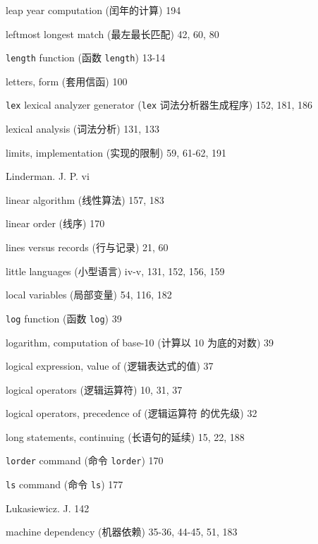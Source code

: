 \begin{multicols}{3}
\hangindent=3pc  leap year computation (闰年的计算) 194

\hangindent=3pc  leftmost longest match (最左最长匹配) 42, 60, 80

\hangindent=3pc  \verb'length' function (函数 \verb'length') 13-14

\hangindent=3pc  letters, form (套用信函) 100

\hangindent=3pc  \verb'lex' lexical analyzer generator
(\verb'lex' 词法分析器生成程序) 152, 181, 186

\hangindent=3pc  lexical analysis (词法分析) 131, 133

\hangindent=3pc  limits, implementation (实现的限制) 59, 61-62, 191

\hangindent=3pc  Linderman. J. P. vi

\hangindent=3pc  linear algorithm (线性算法) 157, 183

\hangindent=3pc  linear order (线序) 170

\hangindent=3pc  lines versus records (行与记录) 21, 60

\hangindent=3pc  little languages (小型语言) iv-v, 131, 152, 156, 159

\hangindent=3pc  local variables (局部变量) 54, 116, 182

\hangindent=3pc  \verb'log' function (函数 \verb'log') 39

\hangindent=3pc  logarithm, computation of base-10 (计算以 10
为底的对数) 39

\hangindent=3pc  logical expression, value of (逻辑表达式的值) 37

\hangindent=3pc  logical operators (逻辑运算符) 10, 31, 37

\hangindent=3pc  logical operators, precedence of (逻辑运算符
的优先级) 32

\hangindent=3pc  long statements, continuing (长语句的延续)
15, 22, 188

\hangindent=3pc  \verb'lorder' command (命令 \verb'lorder') 170

\hangindent=3pc  \verb'ls' command (命令 \verb'ls') 177

\hangindent=3pc  Lukasiewicz. J. 142

\hangindent=3pc  machine dependency (机器依赖) 35-36, 44-45, 51, 183


\end{multicols}
